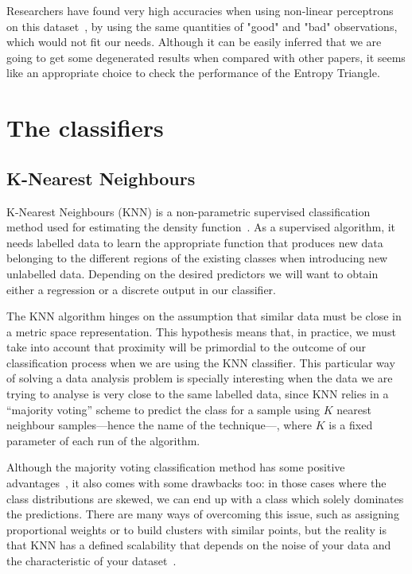 Researchers have found very high accuracies when using non-linear perceptrons on this dataset~\cite{Sigillito1989ClassificationOR}, by using the same quantities of "good" and "bad" observations, which would not fit our needs. Although it can be easily inferred that we are going to get some degenerated results when compared with other papers, it seems like an appropriate choice to check the performance of the Entropy Triangle. \par 

\section{The classifiers}
\subsection{K-Nearest Neighbours}

K-Nearest Neighbours (KNN) is a non-parametric supervised classification method used for estimating the density function~\cite{mur:12}. As a supervised algorithm, it needs labelled data to learn the appropriate function that produces new data belonging to the different regions of the existing classes when introducing new unlabelled data. Depending on the desired predictors we will want to obtain either a regression or a discrete output in our classifier. 

The KNN algorithm hinges on the assumption that similar data must be close in a metric space representation. This hypothesis means that, in practice, we must take into account that proximity will be primordial to the outcome of our classification process when we are using the KNN classifier. This particular way of solving a data analysis problem is specially interesting when the data we are trying to analyse is very close to the same labelled data, since KNN relies in a ``majority voting'' scheme to predict the class for a sample using $K$ nearest neighbour samples---hence the name of the technique---, where $K$ is a fixed parameter of each run of the algorithm. 

Although the majority voting classification method has some positive advantages~\cite{article_voting_algorithms}, it also comes with some drawbacks too: in those cases where the class distributions are skewed, we can end up with a class which solely dominates the predictions. There are many ways of overcoming this issue, such as assigning proportional weights or to build clusters with similar points, but the reality is that KNN has a defined scalability that depends on the noise of your data and the characteristic of your dataset~\cite{Knn_characteristics}. \par

